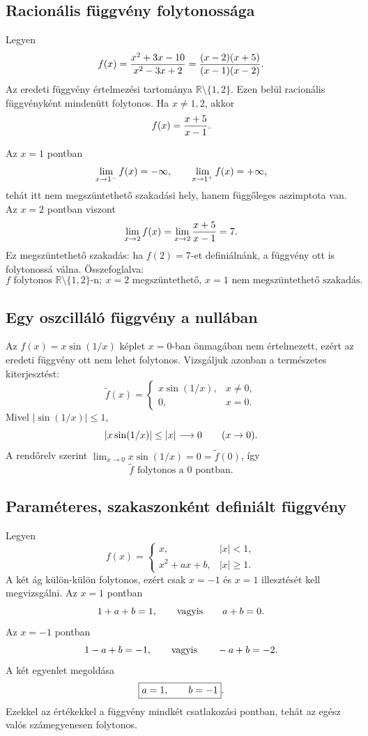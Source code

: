 \documentclass{szb-solution}
\begin{document}
\subsection{Racionális függvény folytonossága}

Legyen
$$
  f(x)=\frac{x^2+3x-10}{x^2-3x+2}
  =\frac{(x-2)(x+5)}{(x-1)(x-2)}
  \text.
$$
Az eredeti függvény értelmezési tartománya
$\mathbb R\setminus\{1,2\}$. Ezen belül racionális függvényként mindenütt
folytonos. Ha $x\neq1,2$, akkor
$$
  f(x)=\frac{x+5}{x-1}
  \text.
$$

Az $x=1$ pontban
$$
  \lim_{x\to1^-}f(x)=-\infty,
  \qquad
  \lim_{x\to1^+}f(x)=+\infty
  \text,
$$
tehát itt nem megszüntethető szakadási hely, hanem függőleges aszimptota van.
Az $x=2$ pontban viszont
$$
  \lim_{x\to2}f(x)=\lim_{x\to2}\frac{x+5}{x-1}=7
  \text.
$$
Ez megszüntethető szakadás: ha $f(2)=7$-et definiálnánk, a függvény ott is
folytonossá válna. Összefoglalva:
$$
  \boxed{f\text{ folytonos }\mathbb R\setminus\{1,2\}\text{-n};
  \ x=2\text{ megszüntethető, }x=1\text{ nem megszüntethető szakadás}.}
$$

\subsection{Egy oszcilláló függvény a nullában}

Az $f(x)=x\sin(1/x)$ képlet $x=0$-ban önmagában nem értelmezett, ezért az
eredeti függvény ott nem lehet folytonos. Vizsgáljuk azonban a természetes
kiterjesztést:
$$
  \widetilde f(x)=
  \begin{cases}
    x\sin(1/x),&x\neq0,\\
    0,&x=0.
  \end{cases}
$$
Mivel $|\sin(1/x)|\leq1$,
$$
  |x\sin(1/x)|\leq|x|\longrightarrow0
  \qquad(x\to0)
  \text.
$$
A rendőrelv szerint $\lim_{x\to0}x\sin(1/x)=0=\widetilde f(0)$, így
$$
  \boxed{\widetilde f\text{ folytonos a }0\text{ pontban}.}
$$

\subsection{Paraméteres, szakaszonként definiált függvény}

Legyen
$$
  f(x)=
  \begin{cases}
    x,&|x|<1,\\
    x^2+ax+b,&|x|\geq1.
  \end{cases}
$$
A két ág külön-külön folytonos, ezért csak $x=-1$ és $x=1$ illesztését
kell megvizsgálni. Az $x=1$ pontban
$$
  1+a+b=1,
  \qquad\text{vagyis}\qquad a+b=0
  \text.
$$
Az $x=-1$ pontban
$$
  1-a+b=-1,
  \qquad\text{vagyis}\qquad -a+b=-2
  \text.
$$
A két egyenlet megoldása
$$
  \boxed{a=1,\qquad b=-1}
  \text.
$$
Ezekkel az értékekkel a függvény mindkét csatlakozási pontban, tehát az
egész valós számegyenesen folytonos.
\end{document}
